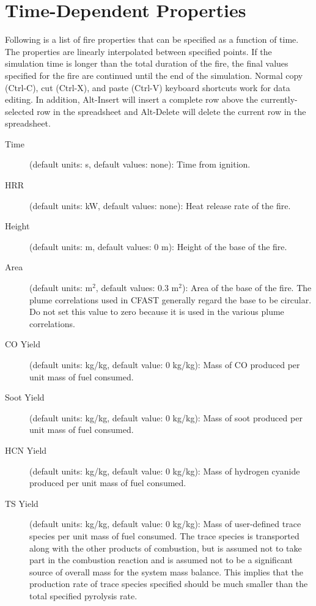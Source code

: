 \section{Time-Dependent Properties}
\label{info:FIRE2}
Following is a list of fire properties that can be specified as a function of time. The properties are linearly interpolated between specified points. If the simulation time is longer than the total duration of the fire, the final values specified for the fire are continued until the end of the simulation. Normal copy (Ctrl-C), cut (Ctrl-X), and paste (Ctrl-V) keyboard shortcuts work for data editing. In addition, Alt-Insert will insert a complete row above the currently-selected row in the spreadsheet and Alt-Delete will delete the current row in the spreadsheet.
\begin{description}
\item[Time] (default units: s, default values: none): Time from ignition.
\item[HRR] (default units: kW, default values: none): Heat release rate of the fire.
\item[Height] (default units: m, default values: 0 m): Height of the base of the fire.
\item[Area] (default units: m$^2$, default values: 0.3 m$^2$): Area of the base of the fire. The plume correlations used in CFAST generally regard the base to be circular. Do not set this value to zero because it is used in the various plume correlations.
\item[CO Yield] (default units: kg/kg, default value: 0 kg/kg): Mass of CO produced per unit mass of fuel consumed.
\item[Soot Yield] (default units: kg/kg, default value: 0 kg/kg): Mass of soot produced per unit mass of fuel consumed.
\item[HCN Yield] (default units: kg/kg, default value: 0 kg/kg): Mass of hydrogen cyanide produced per unit mass of fuel consumed.
\item[TS Yield] (default units: kg/kg, default value: 0 kg/kg): Mass of user-defined trace species per unit mass of fuel consumed. The trace species is transported along with the other products of combustion, but is assumed not to take part in the combustion reaction and is assumed not to be a significant source of overall mass for the system mass balance. This implies that the production rate of trace species specified should be much smaller than the total specified pyrolysis rate.
\end{description}


